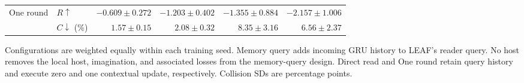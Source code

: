 {\begin{table}[!t]
\begin{tabular*}{\textwidth}{@{\extracolsep{\fill}}llrrrr@{}}
\addlinespace[2pt]
One round & $R\uparrow$ & $-0.609\pm0.272$ & $-1.203\pm0.402$ & $-1.355\pm0.884$ & $-2.157\pm1.006$ \\
 & $C\downarrow$ (\%) & $1.57\pm0.15$ & $2.08\pm0.32$ & $8.35\pm3.16$ & $6.56\pm2.37$ \\
\bottomrule
\end{tabular*}
\par\vspace{2pt}\parbox{\textwidth}{\footnotesize
Configurations are weighted equally within each training seed. Memory query adds incoming GRU history to LEAF's reader query. No host removes the local host, imagination, and associated losses from the memory-query design. Direct read and One round retain query history and execute zero and one contextual update, respectively. Collision SDs are percentage points.}
\end{table}}

